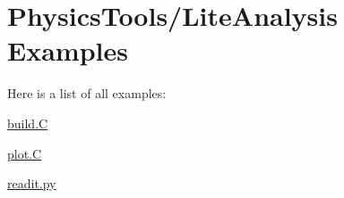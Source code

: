 \section{Physics\-Tools/Lite\-Analysis Examples}
Here is a list of all examples:\begin{CompactItemize}
\item 
\hyperlink{build_8C-example}{build.C}
\item 
\hyperlink{plot_8C-example}{plot.C}
\item 
\hyperlink{readit_8py-example}{readit.py}
\end{CompactItemize}
